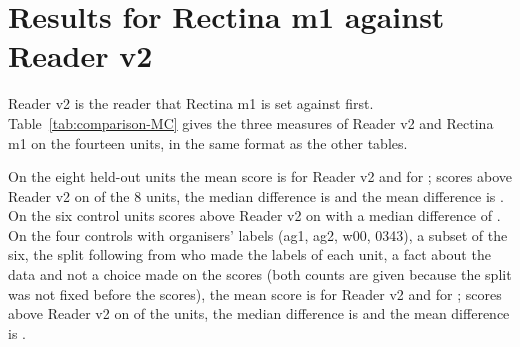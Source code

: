 \section{Results for Rectina m1 against Reader v2}\label{sec:results-MC}

Reader v2 is the reader that Rectina m1 is set against first. Table~\ref{tab:comparison-MC} gives the three measures of Reader v2 and Rectina m1 on the fourteen units, in the same format as the other tables.

\MCHonestSentence{}

\begin{table}[!t]
\caption{Three measures of \MCModelName{} against Reader v2 on the fourteen units, target a: the AUC, the AUC on thin
strokes and false ink at 80 per cent recall. The cell of \MCModelName{} gives in parentheses the signed difference
against Reader v2. The rows Mean and Median are taken \MCStatScope; the
block of the community labels is information only.}\label{tab:comparison-MC}
\centering

\par\smallskip
{\footnotesize\raggedright\par}
\end{table}

On the eight held-out units the mean score is \MCHeldMeanReader{} for Reader v2 and \MCHeldMeanModel{} for \MCModelName{}; \MCModelName{} scores above Reader v2 on \MCHeldAbove{} of the 8
units, the median difference is \MCHeldMedianDiff{} and the mean difference is \MCHeldMeanDiff{}\MCLowHeld. On the six control units \MCModelName{} scores above Reader v2 on \MCStatsCtrlKText{} with a median difference of \MCStatsCtrlMedianDiff{}. On the four controls with organisers' labels (ag1, ag2, w00, 0343), a subset of the six, the split following from who made the labels of each unit, a fact about the data and not a choice made on the scores (both counts are given because the split was not fixed before the scores), the mean score is \MCCtrlMeanReader{} for Reader v2 and \MCCtrlMeanModel{} for
\MCModelName{}; \MCModelName{} scores above Reader v2 on
\MCCtrlAbove{} of the \MCCtrlN{} units, the median difference is \MCCtrlMedianDiff{} and the mean difference is
\MCCtrlMeanDiff{}\MCLowCtrl.

\MCFalseInkParagraph{}

\MCStatsParagraph{} \MCSeedParagraph{}
